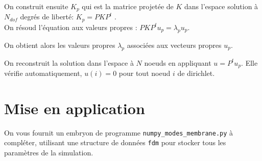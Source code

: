 \documentclass[a4paper, 12pt]{article}
\newcommand{\matlabscript}[2]
  {\begin{itemize}\item[]\end{itemize}}
\begin{document}
On construit ensuite $K_p$ qui est la matrice projetée de $K$ dans l'espace
solution à $N_ {dof}$ degrés de liberté: $K_p=P K P^t$ . \\

On résoud l'équation aux valeurs propres :
$P K P^t u_p= \lambda_p u_p$.

On obtient alors les valeurs propres $\lambda_p$ associées
aux vecteurs propres $u_p$. 


On reconstruit la solution dans l'espace à $N$ noeuds en appliquant $u=P^t u_p$. 
Elle vérifie automatiquement, $u(i)=0$ pour tout noeud $i$ de dirichlet.
 
  
\section{Mise en application}

On vous fournit un embryon de programme {\tt numpy\_modes\_membrane.py}  à compléter,
utilisant une structure de
données {\tt fdm} pour stocker tous les paramètres de la simulation.
\end{document}
